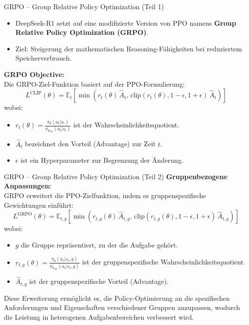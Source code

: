\documentclass[aspectratio=1610, xcolor=dvipsnames, 9pt]{beamer}
\begin{document}
\begin{frame}{GRPO – Group Relative Policy Optimization (Teil 1)}
  \begin{itemize}
      \item DeepSeek-R1 setzt auf eine modifizierte Version von PPO namens \textbf{Group Relative Policy Optimization (GRPO)}.
      \item Ziel: Steigerung der mathematischen Reasoning-Fähigkeiten bei reduziertem Speicherverbrauch.
  \end{itemize}
  \vspace{0.3cm}
  \textbf{GRPO Objective:}\\[0.2cm]
  Die GRPO-Ziel-Funktion basiert auf der PPO-Formulierung:
  \[
  L^{\mathrm{CLIP}}(\theta) = \mathbb{E}_{t} \left[ \min \left( r_{t}(\theta) \,\hat{A}_{t},\, \mathrm{clip}\left(r_{t}(\theta), 1-\epsilon, 1+\epsilon \right) \,\hat{A}_{t} \right) \right]
  \]
  wobei:
  \begin{itemize}
      \item \( r_{t}(\theta) = \frac{\pi_{\theta}(a_t|s_t)}{\pi_{\theta_{\mathrm{old}}}(a_t|s_t)} \) ist der Wahrscheinlichkeitsquotient.
      \item \( \hat{A}_{t} \) bezeichnet den Vorteil (Advantage) zur Zeit \( t \).
      \item \( \epsilon \) ist ein Hyperparameter zur Begrenzung der Änderung.
  \end{itemize}
\end{frame}

\begin{frame}{GRPO – Group Relative Policy Optimization (Teil 2)}
  \textbf{Gruppenbezogene Anpassungen:}\\[0.2cm]
  GRPO erweitert die PPO-Zielfunktion, indem es gruppenspezifische Gewichtungen einführt:
  \[
  L^{\mathrm{GRPO}}(\theta) = \mathbb{E}_{t, g} \left[ \min \left( r_{t,g}(\theta) \,\hat{A}_{t,g},\, \mathrm{clip}\left(r_{t,g}(\theta), 1-\epsilon, 1+\epsilon \right) \,\hat{A}_{t,g} \right) \right]
  \]
  wobei:
  \begin{itemize}
      \item \( g \) die Gruppe repräsentiert, zu der die Aufgabe gehört.
      \item \( r_{t,g}(\theta) = \frac{\pi_{\theta}(a_t|s_t, g)}{\pi_{\theta_{\mathrm{old}}}(a_t|s_t, g)} \) ist der gruppenspezifische Wahrscheinlichkeitsquotient.
      \item \( \hat{A}_{t,g} \) ist der gruppenspezifische Vorteil (Advantage).
  \end{itemize}
  Diese Erweiterung ermöglicht es, die Policy-Optimierung an die spezifischen Anforderungen und Eigenschaften verschiedener Gruppen anzupassen, wodurch die Leistung in heterogenen Aufgabenbereichen verbessert wird.
\end{frame}
\end{document}
